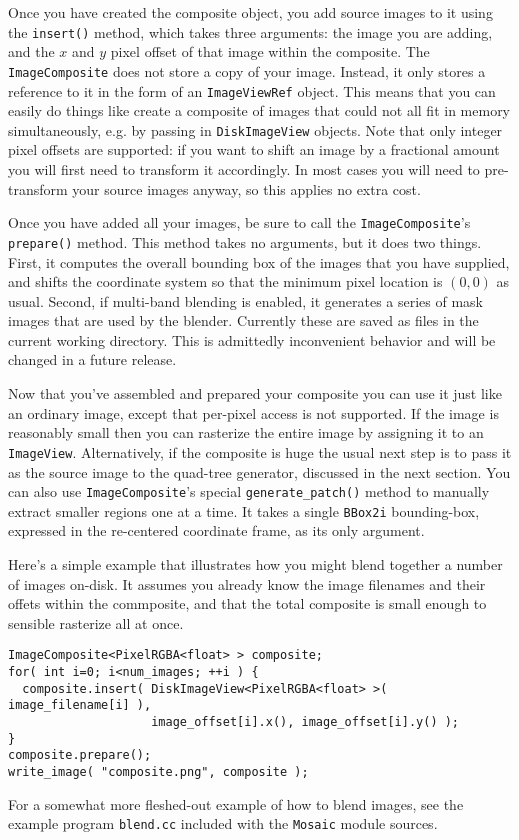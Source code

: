 Once you have created the composite object, you add source images to
it using the \verb#insert()# method, which takes three arguments: the
image you are adding, and the $x$ and $y$ pixel offset of that image
within the composite.  The \verb#ImageComposite# does not store a copy
of your image.  Instead, it only stores a reference to it in the form
of an \verb#ImageViewRef# object.  This means that you can easily do
things like create a composite of images that could not all fit in
memory simultaneously, e.g. by passing in \verb#DiskImageView#
objects.  Note that only integer pixel offsets are supported: if you
want to shift an image by a fractional amount you will first need to
transform it accordingly.  In most cases you will need to
pre-transform your source images anyway, so this applies no extra
cost.

Once you have added all your images, be sure to call the 
\verb#ImageComposite#'s \verb#prepare()# method.  This method takes 
no arguments, but it does two things.  First, it computes the 
overall bounding box of the images that you have supplied, and 
shifts the coordinate system so that the minimum pixel location 
is $(0,0)$ as usual.  Second, if multi-band blending is enabled, 
it generates a series of mask images that are used by the blender. 
Currently these are saved as files in the current working directory. 
This is admittedly inconvenient behavior and will be changed in a 
future release.

Now that you've assembled and prepared your composite you can use 
it just like an ordinary image, except that per-pixel access is 
not supported.  If the image is reasonably small then you can 
rasterize the entire image by assigning it to an \verb#ImageView#. 
Alternatively, if the composite is huge the usual next step is to 
pass it as the source image to the quad-tree generator, discussed 
in the next section.  You can also use \verb#ImageComposite#'s 
special \verb#generate_patch()# method to manually extract smaller 
regions one at a time.  It takes a single \verb#BBox2i# bounding-box, 
expressed in the re-centered coordinate frame, as its only argument.

Here's a simple example that illustrates how you might blend 
together a number of images on-disk.  It assumes you already know 
the image filenames and their offets within the commposite, and 
that the total composite is small enough to sensible rasterize all 
at once.
\begin{verbatim}
ImageComposite<PixelRGBA<float> > composite;
for( int i=0; i<num_images; ++i ) {
  composite.insert( DiskImageView<PixelRGBA<float> >( image_filename[i] ),
                    image_offset[i].x(), image_offset[i].y() );
}
composite.prepare();
write_image( "composite.png", composite );
\end{verbatim}
For a somewhat more fleshed-out example of how to blend images, 
see the example program \verb#blend.cc# included with the 
\verb#Mosaic# module sources.

